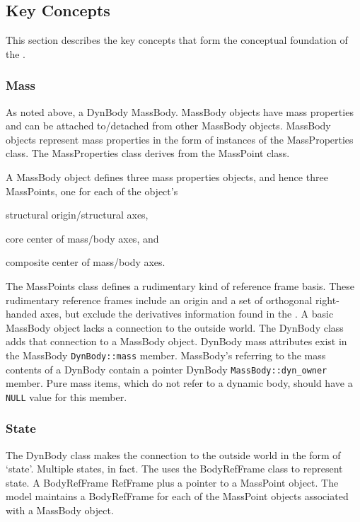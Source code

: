 \subsection{Key Concepts}\label{sec:key_concepts}
This section describes the key concepts that form the conceptual foundation of
the \ModelDesc.

\subsubsection{Mass}\label{sec:key_mass}
As noted above, a DynBody \hasa MassBody.
MassBody objects have mass properties and can be attached to/detached from
other MassBody objects. MassBody objects represent mass properties in the
form of instances of the MassProperties class.
The MassProperties class derives from the MassPoint class.

A MassBody object defines three mass properties objects, and hence three
MassPoints, one for each of the object's \begin{inparaenum}[(1)]
\item structural origin/structural axes,
\item core center of mass/body axes, and
\item composite center of mass/body axes.
\end{inparaenum}
The MassPoints class defines a rudimentary kind of reference frame basis. These
rudimentary reference frames include an origin and a set of orthogonal
right-handed axes, but exclude the derivatives information found in the
.
A basic MassBody object lacks a connection to the
outside world. The DynBody class adds that connection to a MassBody object.
DynBody mass attributes exist in the MassBody \verb+DynBody::mass+  member.
MassBody's referring to the mass contents of a DynBody contain a pointer DynBody \verb+MassBody::dyn_owner+ member.
Pure mass items, which do not refer to a dynamic body, should have a \verb+NULL+ value for this member.

\subsubsection{State}
The DynBody class makes the connection to the outside world in the form of
`state'.  Multiple states, in fact. The \ModelDesc uses the BodyRefFrame
class to represent state. A BodyRefFrame \isa RefFrame plus a pointer
to a MassPoint object. The model maintains a BodyRefFrame for each of the
MassPoint objects associated with a MassBody object.


